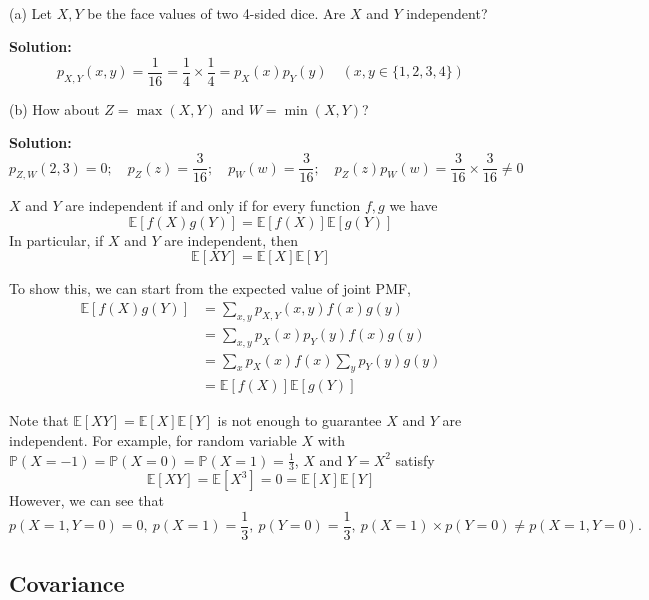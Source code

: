 \begin{eg}~ 

    (a) Let \(X, Y\) be the face values of two 4-sided dice. Are \(X\) and \(Y\) independent?

    \textbf{Solution:} 
    \[
        p_{X, Y}(x, y) = \dfrac{1}{16} =\dfrac{1}{4} \times \dfrac{1}{4} = p_X(x)p_Y(y) \quad (x, y \in \{1, 2, 3, 4\})
    \]

    (b) How about \(Z = \max(X, Y)\) and \(W = \min(X, Y)\)?

    \textbf{Solution:} 
    \[
        p_{Z, W}(2, 3) = 0;\quad p_Z(z) = \dfrac{3}{16};\quad p_W(w) =\dfrac{3}{16};\quad p_Z(z)p_W(w) = \dfrac{3}{16} \times \dfrac{3}{16} \neq 0
    \]
\end{eg}

\begin{theorem}
    \(X\) and \(Y\) are independent if and only if for every function \(f, g\) we have 
    \[
        \mathbb{E}[f(X)g(Y)] = \mathbb{E}[f(X)]\mathbb{E}[g(Y)]
    \]
    In particular, if \(X\) and \(Y\) are independent, then
    \[
        \mathbb{E}[XY] = \mathbb{E}[X]\mathbb{E}[Y]
    \]
\end{theorem}

To show this, we can start from the expected value of joint PMF, 
\[
    \begin{aligned}
        \mathbb{E}[f(X)g(Y)] &= \sum_{x, y} p_{X,Y}(x, y)f(x)g(y) \\
        &= \sum_{x, y} p_{X}(x)p_{Y}(y)f(x)g(y) \\
        &= \sum_{x} p_{X}(x)f(x) \sum_{y} p_{Y}(y)g(y) \\
        &= \mathbb{E}[f(X)]\mathbb{E}[g(Y)]
    \end{aligned}
\]

Note that \(\mathbb{E}[XY] = \mathbb{E}[X]\mathbb{E}[Y]\) is not enough to guarantee \(X\) and \(Y\) are independent. For example, for random variable \(X\) with \(\mathbb{P}(X = -1) = \mathbb{P}(X = 0) = \mathbb{P}(X = 1) = \frac{1}{3}\), \(X\) and \(Y = X^2\) satisfy 
\[
    \mathbb{E}[XY] = \mathbb{E}[X^3] = 0 = \mathbb{E}[X]\mathbb{E}[Y]
\]
However, we can see that 
\[
    p(X = 1, Y = 0) = 0,\ p(X = 1) = \frac{1}{3},\ p(Y = 0) = \frac{1}{3},\ p(X = 1) \times p(Y = 0) \neq p(X = 1, Y = 0).
\] 

\subsection{Covariance}

